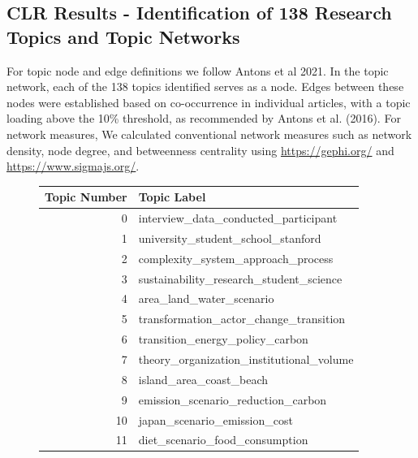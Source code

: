 \documentclass[12pt]{article}
\begin{document}
\subsection{CLR Results - Identification of 138 Research Topics and Topic Networks}
\label{sec:research_topic_networks}
For topic node and edge definitions we follow Antons et al 2021. In the topic network, each of the 138 topics identified serves as a node. Edges between these nodes were established based on co-occurrence in individual articles, with a topic loading above the 10\% threshold, as recommended by Antons et al. (2016). For network measures, We calculated conventional network measures such as network density, node degree, and betweenness centrality using \hyperlink{Gephi}{https://gephi.org/} and \hyperlink{Sigma.js}{https://www.sigmajs.org/}. 

\begin{landscape}
\begin{figure}[htbp]
  \centering
  \begin{minipage}{0.25\textwidth}
    \tiny %
    \begin{tabular}{rl}
      \toprule
      Topic Number & Topic Label \\
      \midrule
      0 &               interview\_data\_conducted\_participant \\
            1 &                 university\_student\_school\_stanford \\
            2 &                 complexity\_system\_approach\_process \\
            3 &            sustainability\_research\_student\_science \\
            4 &                           area\_land\_water\_scenario \\
            5 &             transformation\_actor\_change\_transition \\
            6 &                    transition\_energy\_policy\_carbon \\
            7 &           theory\_organization\_institutional\_volume \\
            8 &                            island\_area\_coast\_beach \\
            9 &                 emission\_scenario\_reduction\_carbon \\
           10 &                       japan\_scenario\_emission\_cost \\
           11 &                     diet\_scenario\_food\_consumption \\

\end{tabular}
\end{minipage}
\end{figure}
\end{landscape}
\end{document}
